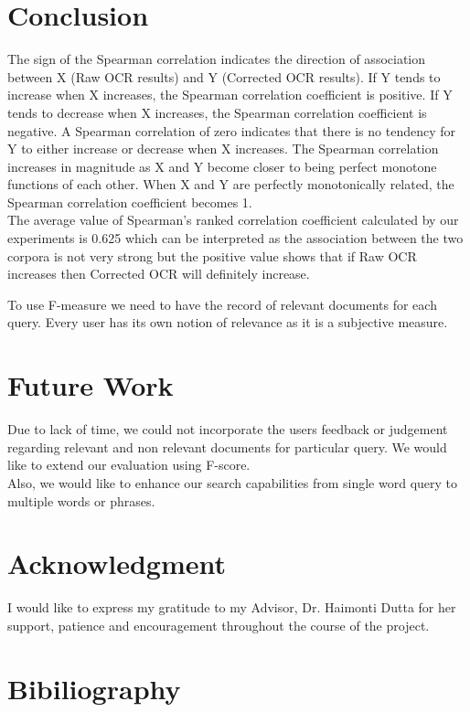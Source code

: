\documentclass[10pt, conference, compsocconf]{IEEEtran}
\begin{document}
\section{Conclusion}
The sign of the Spearman correlation indicates the direction of association between X (Raw OCR results) and Y (Corrected OCR results). If Y tends to increase when X increases, the Spearman correlation coefficient is positive. If Y tends to decrease when X increases, the Spearman correlation coefficient is negative. A Spearman correlation of zero indicates that there is no tendency for Y to either increase or decrease when X increases. The Spearman correlation increases in magnitude as X and Y become closer to being perfect monotone functions of each other. When X and Y are perfectly monotonically related, the Spearman correlation coefficient becomes 1. \\
The average value of Spearman's ranked correlation coefficient calculated by our experiments is 0.625 which can be interpreted as the association between the two corpora is not very strong but the positive value shows that if Raw OCR increases then Corrected OCR will definitely increase.

To use F-measure we need to have the record of relevant documents for each query. Every user has its own notion of relevance as it is a subjective measure.\\



\section{Future Work}
Due to lack of time, we could not incorporate the users feedback or judgement regarding relevant and non relevant documents for particular query. We would like to extend our evaluation using F-score. \\
Also, we would like to enhance our search capabilities from single word query to multiple words or phrases. \\


\section*{Acknowledgment}
I would like to express my gratitude to my Advisor, Dr. Haimonti Dutta for her support, patience and encouragement throughout the course of the project. \\

\nocite{datasource,cdnc,digital}

\section{Bibiliography}



\end{document}
